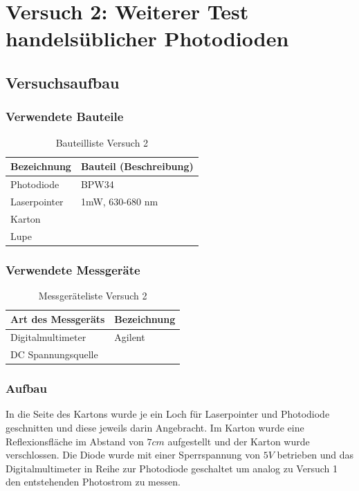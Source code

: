 \section{Versuch 2: Weiterer Test handelsüblicher Photodioden}
\subsection{Versuchsaufbau}
\subsubsection{Verwendete Bauteile}
\begin{table}[H]
	\centering
	\caption{Bauteilliste Versuch 2}
	\begin{tabular}{|l|l|}
		\hline
		Bezeichnung & Bauteil (Beschreibung)
		\\\hline
		Photodiode & BPW34
		\\\hline
		Laserpointer & 1mW, 630-680 nm
		\\\hline
		Karton & 
		\\\hline
		Lupe &
		\\\hline
	\end{tabular}
\end{table}

\subsubsection{Verwendete Messgeräte}
\begin{table}[H]
	\centering
	\caption{Messgeräteliste Versuch 2}
	\begin{tabular}{|l|l|}
		\hline
		Art des Messgeräts & Bezeichnung
		\\\hline
		Digitalmultimeter & Agilent
		\\\hline
		DC Spannungsquelle & 
		\\\hline
	\end{tabular}
\end{table}
\subsubsection{Aufbau}
In die Seite des Kartons wurde je ein Loch für Laserpointer und Photodiode geschnitten und diese jeweils darin Angebracht. Im Karton wurde eine Reflexionsfläche im Abstand von $7cm$ aufgestellt und der Karton wurde verschlossen. Die Diode wurde mit einer Sperrspannung von $5V$ betrieben und das Digitalmultimeter in Reihe zur Photodiode geschaltet um analog zu Versuch 1 den entstehenden Photostrom zu messen. 
